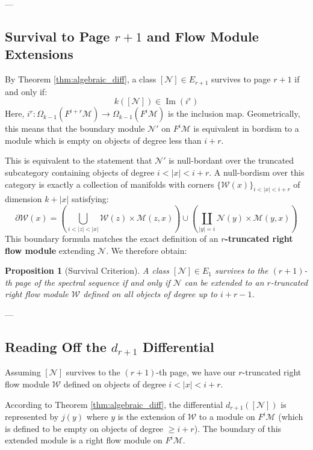 \documentclass[a4paper,11pt]{article}
\theoremstyle{plain}
\newtheorem{prop}[thm]{Proposition}
\theoremstyle{definition}
\theoremstyle{remark}
\newcommand{\flowM}{\mathcal{M}}
\newcommand{\Image}{\operatorname{Im}}
\begin{document}
---

\subsection{Survival to Page $r+1$ and Flow Module Extensions}

By Theorem \ref{thm:algebraic_diff}, a class $[\mathcal{N}] \in E_{r+1}$ survives to page $r+1$ if and only if:
\[
k([\mathcal{N}]) \in \Image(i^r)
\]
Here, $i^r \colon \Omega_{k-1}(F^{i+r}\flowM) \to \Omega_{k-1}(F^i\flowM)$ is the inclusion map. Geometrically, this means that the boundary module $\mathcal{N}'$ on $F^i \flowM$ is equivalent in bordism to a module which is empty on objects of degree less than $i+r$.

This is equivalent to the statement that $\mathcal{N}'$ is null-bordant over the truncated subcategory containing objects of degree $i < |x| < i+r$. A null-bordism over this category is exactly a collection of manifolds with corners $\{\mathcal{W}(x)\}_{i < |x| < i+r}$ of dimension $k + |x|$ satisfying:
\[
\partial \mathcal{W}(x) = \left( \bigcup_{i < |z| < |x|} \mathcal{W}(z) \times \flowM(z, x) \right) \cup \left( \coprod_{|y|=i} \mathcal{N}(y) \times \flowM(y, x) \right)
\]
This boundary formula matches the exact definition of an \textbf{$r$-truncated right flow module} extending $\mathcal{N}$. We therefore obtain:

\begin{prop}[Survival Criterion]
A class $[\mathcal{N}] \in E_1$ survives to the $(r+1)$-th page of the spectral sequence if and only if $\mathcal{N}$ can be extended to an $r$-truncated right flow module $\mathcal{W}$ defined on all objects of degree up to $i+r-1$.
\end{prop}

---

\subsection{Reading Off the $d_{r+1}$ Differential}

Assuming $[\mathcal{N}]$ survives to the $(r+1)$-th page, we have our $r$-truncated right flow module $\mathcal{W}$ defined on objects of degree $i < |x| < i+r$. 

According to Theorem \ref{thm:algebraic_diff}, the differential $d_{r+1}([\mathcal{N}])$ is represented by $j(y)$ where $y$ is the extension of $\mathcal{W}$ to a module on $F^i \flowM$ (which is defined to be empty on objects of degree $\geq i+r$). The boundary of this extended module is a right flow module on $F^i \flowM$. 
\end{document}
